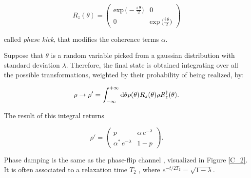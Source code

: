  \begin{equation}
R_z(\theta) = \begin{pmatrix} \text{exp}\, \bigl( - \frac{i\, \theta}{2} \bigr)  & 0 \\  0 &  \text{exp}\, \bigl(  \frac{i\, \theta}{2} \bigr) \end{pmatrix}  
  \label{31_firstchapter}
 \end{equation}

\noindent called \textit{phase kick}, that modifies the coherence terms $\alpha$. 

Suppose that $\theta$ is a random variable picked from a gaussian distribution with standard deviation $\lambda$. 
Therefore, the final state is obtained integrating over all the possible transformations, weighted by their probability of being realized, by:

\begin{equation}
\rho \rightarrow \rho' = \int_{-\infty}^{+\infty} \mathrm{d} \theta p(\theta)R_z(\theta) \rho R_z^\dagger (\theta).
  \label{33_firstchapter}
\end{equation}

\noindent The result of this integral returns
 
 \begin{equation}
\rho' = \begin{pmatrix} p & \alpha\, e^{- \lambda}  \\  \alpha^*\, e^{- \lambda} & 1-p \end{pmatrix}.
  \label{34_firstchapter}
\end{equation}

\noindent Phase damping is the same as the phase-flip channel \cite{Nielsen}, visualized in Figure \ref{C_2}. It is often associated to a relaxation time $T_2$ , where $e^{-t/2T_2}=\sqrt{1-\lambda}$.


